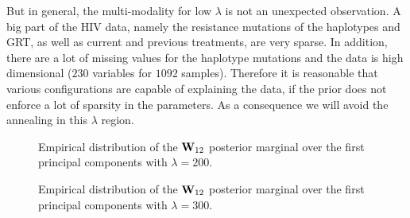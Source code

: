 But in general, the multi-modality for low $\lambda$ is not an unexpected observation.
A big part of the HIV data, namely the resistance mutations of the haplotypes and GRT, as well as current and previous treatments, are very sparse.
In addition, there are a lot of missing values for the haplotype mutations and the data is high dimensional ($230$ variables for $1092$ samples).
Therefore it is reasonable that various configurations are capable of explaining the data, if the prior does not enforce a lot of sparsity in the parameters.
As a consequence we will avoid the annealing in this $\lambda$ region.

\begin{figure}[H]
	\centering
	\caption{Empirical distribution of the $\mathbf{W}_{12}$ posterior marginal over the first principal components with $\lambda=200$.}
	
	\label{fig:unimodality_HIV200}
\end{figure}
\begin{figure}[H]
	\centering
	\caption{Empirical distribution of the $\mathbf{W}_{12}$ posterior marginal over the first principal components with $\lambda=300$.}
	
	\label{fig:unimodality_HIV300}
\end{figure}

\begin{figure}[H]
	\centering
	\qquad\qquad\qquad\\
	\qquad\qquad\qquad
	\qquad\qquad\qquad\\
	\qquad\qquad\qquad
\end{figure}




